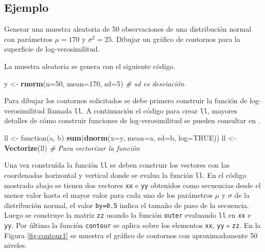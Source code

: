 \documentclass[10pt,]{krantz}
\makeatletter
\newenvironment{Shaded}{\begin{snugshade}}{\end{snugshade}}
\newcommand{\KeywordTok}[1]{\textcolor[rgb]{0.13,0.29,0.53}{\textbf{{#1}}}}
\newcommand{\DataTypeTok}[1]{\textcolor[rgb]{0.13,0.29,0.53}{{#1}}}
\newcommand{\DecValTok}[1]{\textcolor[rgb]{0.00,0.00,0.81}{{#1}}}
\newcommand{\StringTok}[1]{\textcolor[rgb]{0.31,0.60,0.02}{{#1}}}
\newcommand{\CommentTok}[1]{\textcolor[rgb]{0.56,0.35,0.01}{\textit{{#1}}}}
\newcommand{\OtherTok}[1]{\textcolor[rgb]{0.56,0.35,0.01}{{#1}}}
\newcommand{\NormalTok}[1]{{#1}}
\newenvironment{kframe}{%
\medskip{}
\setlength{\fboxsep}{.8em}
 \def\at@end@of@kframe{}%
 \ifinner\ifhmode%
  \def\at@end@of@kframe{\end{minipage}}%
  \begin{minipage}{\columnwidth}%
 \fi\fi%
 \def\FrameCommand##1{\hskip\@totalleftmargin \hskip-\fboxsep
 \colorbox{shadecolor}{##1}\hskip-\fboxsep
     \hskip-\linewidth \hskip-\@totalleftmargin \hskip\columnwidth}%
 \MakeFramed {\advance\hsize-\width
   \@totalleftmargin\z@ \linewidth\hsize
   \@setminipage}}%
 {\par\unskip\endMakeFramed%
 \at@end@of@kframe}
\renewenvironment{Shaded}{\begin{kframe}}{\end{kframe}}
\makeatother
\begin{document}
\subsection*{Ejemplo}\label{ejemplo-17}


Generar una muestra aleatoria de 50 observaciones de una distribución
normal con parámetros \(\mu=170\) y \(\sigma^2=25\). Dibujar un gráfico
de contornos para la superficie de log-verosimilitud.

La muestra aleatoria se genera con el siguiente código.

\begin{Shaded}
\begin{Highlighting}[]
\NormalTok{y <-}\StringTok{ }\KeywordTok{rnorm}\NormalTok{(}\DataTypeTok{n=}\DecValTok{50}\NormalTok{, }\DataTypeTok{mean=}\DecValTok{170}\NormalTok{, }\DataTypeTok{sd=}\DecValTok{5}\NormalTok{)  }\CommentTok{# sd es desviación}
\end{Highlighting}
\end{Shaded}

Para dibujar los contornos solicitados se debe primero construir la
función de log-verosimilitud llamada \texttt{ll}. A continuación el
código para crear \texttt{ll}, mayores detalles de cómo construir
funciones de log-verosimilitud se pueden consultar en
\citet{hernandez_usuga}.

\begin{Shaded}
\begin{Highlighting}[]
\NormalTok{ll <-}\StringTok{ }\NormalTok{function(a, b) }\KeywordTok{sum}\NormalTok{(}\KeywordTok{dnorm}\NormalTok{(}\DataTypeTok{x=}\NormalTok{y, }\DataTypeTok{mean=}\NormalTok{a, }\DataTypeTok{sd=}\NormalTok{b, }\DataTypeTok{log=}\OtherTok{TRUE}\NormalTok{))}
\NormalTok{ll <-}\StringTok{ }\KeywordTok{Vectorize}\NormalTok{(ll)  }\CommentTok{# Para vectorizar la función}
\end{Highlighting}
\end{Shaded}

Una vez construída la función \texttt{ll} se deben construir los
vectores con las coordenadas horizontal y vertical donde se evalua la
función \texttt{ll}. En el código mostrado abajo se tienen dos vectores
\texttt{xx} e \texttt{yy} obtenidos como secuencias desde el menor valor
hasta el mayor valor para cada uno de los parámetros \(\mu\) y
\(\sigma\) de la distribución normal, el valor \texttt{by=0.5} indica el
tamaño de paso de la secuencia. Luego se construye la matriz \texttt{zz}
usando la función \texttt{outer} evaluando \texttt{ll} en \texttt{xx} e
\texttt{yy}. Por último la función \texttt{contour} se aplica sobre los
elementos \texttt{xx}, \texttt{yy} e \texttt{zz}. En la Figura
\ref{fig:contour1} se muestra el gráfico de contornos con
aproximadamente 50 niveles.
\end{document}
